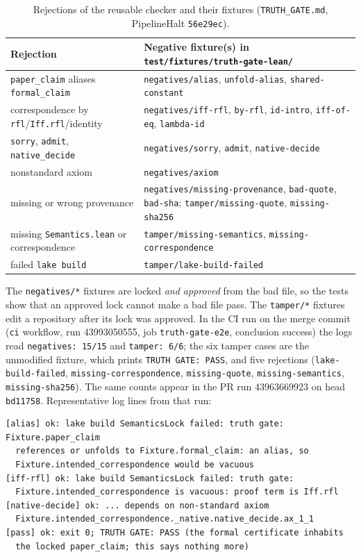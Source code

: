 \documentclass[11pt,a4paper]{article}
\newcommand{\code}[1]{\texttt{#1}}
\begin{document}
\begin{table}[ht]
\centering\small
\begin{tabularx}{\textwidth}{@{}>{\raggedright\arraybackslash}p{4.3cm}>{\raggedright\arraybackslash}X@{}}
\toprule
Rejection & Negative fixture(s) in \code{test/fixtures/truth-gate-lean/}\\
\midrule
\code{paper\_claim} aliases \code{formal\_claim} & \code{negatives/alias}, \code{unfold-alias}, \code{shared-constant}\\
correspondence by \code{rfl}/\code{Iff.rfl}/identity & \code{negatives/iff-rfl}, \code{by-rfl}, \code{id-intro}, \code{iff-of-eq}, \code{lambda-id}\\
\code{sorry}, \code{admit}, \code{native\_decide} & \code{negatives/sorry}, \code{admit}, \code{native-decide}\\
nonstandard axiom & \code{negatives/axiom}\\
missing or wrong provenance & \code{negatives/missing-provenance}, \code{bad-quote}, \code{bad-sha}; \code{tamper/missing-quote}, \code{missing-sha256}\\
missing \code{Semantics.lean} or correspondence & \code{tamper/missing-semantics}, \code{missing-correspondence}\\
failed \code{lake build} & \code{tamper/lake-build-failed}\\
\bottomrule
\end{tabularx}
\caption{Rejections of the reusable checker and their fixtures (\code{TRUTH\_GATE.md}, PipelineHalt \code{56e29ec}).}
\label{tab:rejections}
\end{table}

The \code{negatives/*} fixtures are locked \emph{and approved} from the bad file, so the tests
show that an approved lock cannot make a bad file pass. The \code{tamper/*} fixtures edit a
repository after its lock was approved. In the CI run on the merge commit
(\code{ci} workflow, run 43993050555, job \code{truth-gate-e2e}, conclusion success) the logs
read \code{negatives: 15/15} and \code{tamper: 6/6}; the six tamper cases are the unmodified
fixture, which prints \code{TRUTH GATE: PASS}, and five rejections
(\code{lake-build-failed}, \code{missing-correspondence}, \code{missing-quote},
\code{missing-semantics}, \code{missing-sha256}). The same counts appear in the PR run
43963669923 on head \code{bd11758}. Representative log lines from that run:
\begin{Verbatim}
[alias] ok: lake build SemanticsLock failed: truth gate: Fixture.paper_claim
  references or unfolds to Fixture.formal_claim: an alias, so
  Fixture.intended_correspondence would be vacuous
[iff-rfl] ok: lake build SemanticsLock failed: truth gate:
  Fixture.intended_correspondence is vacuous: proof term is Iff.rfl
[native-decide] ok: ... depends on non-standard axiom
  Fixture.intended_correspondence._native.native_decide.ax_1_1
[pass] ok: exit 0; TRUTH GATE: PASS (the formal certificate inhabits
  the locked paper_claim; this says nothing more)
\end{Verbatim}
\end{document}
